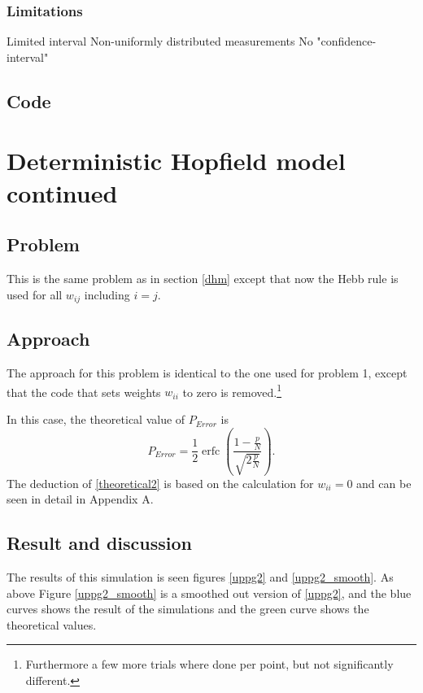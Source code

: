 \documentclass[12pt,a4paper]{article}
\begin{document}
\subsubsection{Limitations}

Limited interval
Non-uniformly distributed measurements
No "confidence-interval"

\subsection{Code}

\section{Deterministic Hopfield model continued}
\subsection{Problem}
This is the same problem as in section \ref{dhm} except that now the Hebb
rule is used for all $w_{ij}$ including $i = j$.
\subsection{Approach}
The approach for this problem is identical to the one used for problem 1,
except that the code that sets weights $w_{ii}$ to zero is
removed.\footnote{Furthermore a few more trials where done per point, but
not significantly different.} 

In this case, the theoretical value of $P_{Error}$ is
\begin{equation} \label{theoretical2}
P_{Error} = \frac{1}{2} \operatorname{erfc}(\frac{1 - \frac{p}{N}}{\sqrt{2 \frac{p}{N}}}).
\end{equation}
The deduction of \eqref{theoretical2} is based on the
calculation for $w_{ii} = 0$ and can be seen in detail in Appendix A.
\subsection{Result and discussion}
The results of this simulation is seen figures \ref{uppg2} and
\ref{uppg2_smooth}. As above Figure \ref{uppg2_smooth} is a smoothed out
version of \ref{uppg2}, and the blue curves shows the result of the
simulations and the green curve shows the theoretical values.
\end{document}
